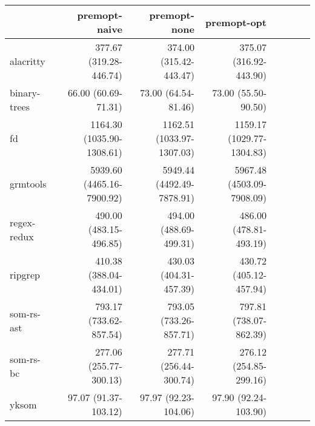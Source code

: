 \begin{tabular}{lrrrrrrr}
\toprule
& premopt-naive & premopt-none & premopt-opt \\
\midrule
alacritty & 377.67 \footnotesize{(319.28-446.74)} & 374.00 \footnotesize{(315.42-443.47)} & 375.07 \footnotesize{(316.92-443.90)} \\
binary-trees & 66.00 \footnotesize{(60.69-71.31)} & 73.00 \footnotesize{(64.54-81.46)} & 73.00 \footnotesize{(55.50-90.50)} \\
fd & 1164.30 \footnotesize{(1035.90-1308.61)} & 1162.51 \footnotesize{(1033.97-1307.03)} & 1159.17 \footnotesize{(1029.77-1304.83)} \\
grmtools & 5939.60 \footnotesize{(4465.16-7900.92)} & 5949.44 \footnotesize{(4492.49-7878.91)} & 5967.48 \footnotesize{(4503.09-7908.09)} \\
regex-redux & 490.00 \footnotesize{(483.15-496.85)} & 494.00 \footnotesize{(488.69-499.31)} & 486.00 \footnotesize{(478.81-493.19)} \\
ripgrep & 410.38 \footnotesize{(388.04-434.01)} & 430.03 \footnotesize{(404.31-457.39)} & 430.72 \footnotesize{(405.12-457.94)} \\
som-rs-ast & 793.17 \footnotesize{(733.62-857.54)} & 793.05 \footnotesize{(733.26-857.71)} & 797.81 \footnotesize{(738.07-862.39)} \\
som-rs-bc & 277.06 \footnotesize{(255.77-300.13)} & 277.71 \footnotesize{(256.44-300.74)} & 276.12 \footnotesize{(254.85-299.16)} \\
yksom & 97.07 \footnotesize{(91.37-103.12)} & 97.97 \footnotesize{(92.23-104.06)} & 97.90 \footnotesize{(92.24-103.90)} \\
\bottomrule
\end{tabular}
